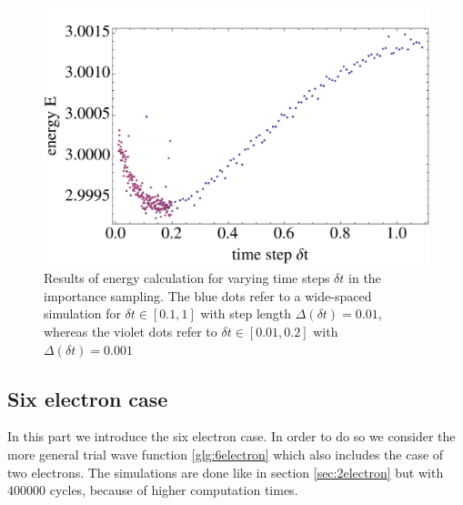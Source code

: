\begin{figure}[htbp]
    \centering
    \includegraphics[scale=0.6]{importance}
    \caption{Results of energy calculation for varying time steps $\delta t$ in the importance sampling. The blue dots refer to a wide-spaced simulation for $\delta t \in [0.1,1]$ with step length $\Delta (\delta t) = 0.01$, whereas the violet dots refer to $\delta t\in [0.01,0.2]$ with $\Delta(\delta t) = 0.001$}
    \label{fig:importance}
\end{figure}
\FloatBarrier

\subsection{Six electron case}
In this part we introduce the six electron case. In order to do so we consider the more general trial wave function \ref{glg:6electron} which also includes the case of two electrons. The simulations are done like in section \ref{sec:2electron} but with $400000$ cycles, because of higher computation times.

